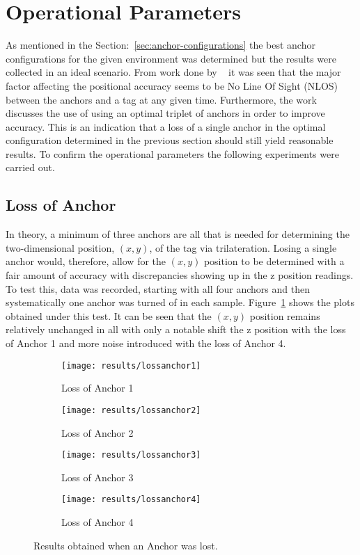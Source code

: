 \section{Operational Parameters}\label{sec:op-params}
As mentioned in the Section:~\ref{sec:anchor-configurations} the best anchor configurations for the given environment was determined  but the results were collected in an ideal scenario.
From work done by ~\citet{evaluwb} it was seen that the major factor affecting the positional accuracy seems to be No Line Of Sight (NLOS) between the anchors and a tag at any given time.
Furthermore, the work discusses the use of using an optimal triplet of anchors in order to improve accuracy.
This is an indication that a loss of a single anchor in the optimal configuration determined in the previous section should still yield reasonable results.
To confirm the operational parameters the following experiments were carried out.

\subsection{Loss of Anchor}\label{subsec:loss-of-anchor}
In theory, a minimum of three anchors are all that is needed for determining the two-dimensional position, $(x,y)$, of the tag via trilateration.
Losing a single anchor would, therefore, allow for the $(x,y)$ position to be determined with a fair amount of accuracy with discrepancies showing up in the z position readings.
To test this, data was recorded, starting with all four anchors and then systematically one anchor was turned of in each sample.
Figure~\ref{fig:Loss_anchors} shows the plots obtained under this test.
It can be seen that the $(x,y)$ position remains relatively unchanged in all with only a notable shift the z position with the loss of Anchor 1 and more noise introduced with the loss of Anchor 4.

\begin{figure}[h!]
    \centering
    \begin{subfigure}{0.45\textwidth}
            \texttt{[image: results/lossanchor1]}
            \caption{Loss of Anchor 1}
    \end{subfigure}
    \begin{subfigure}{0.45\textwidth}
            \texttt{[image: results/lossanchor2]}
            \caption{Loss of Anchor 2}
    \end{subfigure}

    \begin{subfigure}{0.45\textwidth}
            \texttt{[image: results/lossanchor3]}
            \caption{Loss of Anchor 3}
    \end{subfigure}
    \begin{subfigure}{0.45\textwidth}
            \texttt{[image: results/lossanchor4]}
            \caption{Loss of Anchor 4}
    \end{subfigure}
    \caption{Results obtained when an Anchor was lost.}
    \label{fig:Loss_anchors}
\end{figure}
\newpage

